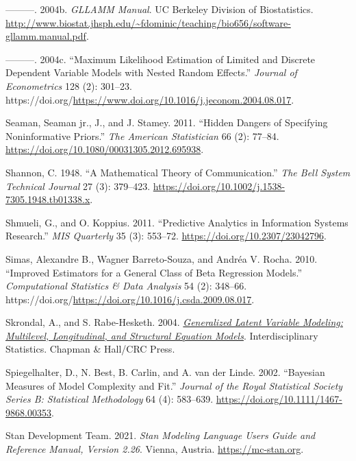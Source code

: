 \documentclass[
sn-apacite
]{sn-jnl}
\newlength{\cslhangindent}
\newenvironment{CSLReferences}[2] %
 {\begin{list}{}{%
  \setlength{\itemindent}{0pt}
  \setlength{\leftmargin}{0pt}
  \setlength{\parsep}{0pt}
  \ifodd #1
   \setlength{\leftmargin}{\cslhangindent}
   \setlength{\itemindent}{-1\cslhangindent}
  \fi
  \setlength{\itemsep}{#2\baselineskip}}}
 {\end{list}}
\begin{document}
\begin{CSLReferences}{1}{0}
---------. 2004b. \emph{GLLAMM Manual}. UC Berkeley Division of
Biostatistics.
\url{http://www.biostat.jhsph.edu/~fdominic/teaching/bio656/software-gllamm.manual.pdf}.

---------. 2004c. {``Maximum Likelihood Estimation of Limited and
Discrete Dependent Variable Models with Nested Random Effects.''}
\emph{Journal of Econometrics} 128 (2): 301--23.
https://doi.org/\url{https://www.doi.org/10.1016/j.jeconom.2004.08.017}.

Seaman, Seaman jr., J., and J. Stamey. 2011. {``Hidden Dangers of
Specifying Noninformative Priors.''} \emph{The American Statistician} 66
(2): 77--84. \url{https://doi.org/10.1080/00031305.2012.695938}.

Shannon, C. 1948. {``A Mathematical Theory of Communication.''}
\emph{The Bell System Technical Journal} 27 (3): 379--423.
\url{https://doi.org/10.1002/j.1538-7305.1948.tb01338.x}.

Shmueli, G., and O. Koppius. 2011. {``Predictive Analytics in
Information Systems Research.''} \emph{MIS Quarterly} 35 (3): 553--72.
\url{https://doi.org/10.2307/23042796}.

Simas, Alexandre B., Wagner Barreto-Souza, and Andréa V. Rocha. 2010.
{``Improved Estimators for a General Class of Beta Regression Models.''}
\emph{Computational Statistics \& Data Analysis} 54 (2): 348--66.
https://doi.org/\url{https://doi.org/10.1016/j.csda.2009.08.017}.

Skrondal, A., and S. Rabe-Hesketh. 2004. \emph{\href{}{Generalized
Latent Variable Modeling: Multilevel, Longitudinal, and Structural
Equation Models}}. Interdisciplinary Statistics. Chapman \& Hall/CRC
Press.

Spiegelhalter, D., N. Best, B. Carlin, and A. van der Linde. 2002.
{``{Bayesian Measures of Model Complexity and Fit}.''} \emph{Journal of
the Royal Statistical Society Series B: Statistical Methodology} 64 (4):
583--639. \url{https://doi.org/10.1111/1467-9868.00353}.

Stan Development Team. 2021. \emph{Stan Modeling Language Users Guide
and Reference Manual, Version 2.26}. Vienna, Austria.
\url{https://mc-stan.org}.


\end{CSLReferences}
\end{document}
